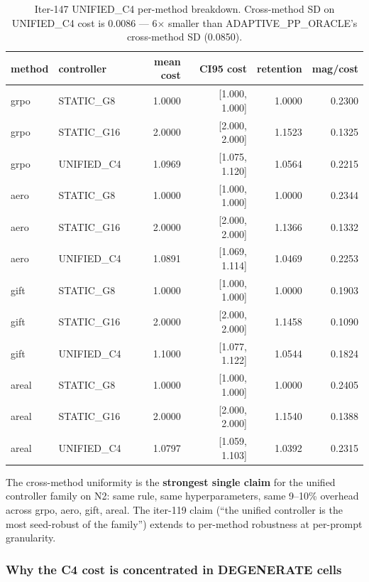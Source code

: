 \documentclass{article}
\begin{document}
\begin{table}[h]
\centering
\small
\caption{Iter-147 UNIFIED\_C4 per-method breakdown. Cross-method SD on
UNIFIED\_C4 cost is 0.0086 --- 6$\times$ smaller than ADAPTIVE\_PP\_ORACLE's
cross-method SD (0.0850).}
\label{tab:p7-iter147-per-method}
\begin{tabular}{llrrrr}
\toprule
method & controller & mean cost & CI95 cost & retention & mag/cost \\
\midrule
grpo  & STATIC\_G8         & 1.0000 & [1.000, 1.000] & 1.0000 & 0.2300 \\
grpo  & STATIC\_G16        & 2.0000 & [2.000, 2.000] & 1.1523 & 0.1325 \\
grpo  & UNIFIED\_C4        & 1.0969 & [1.075, 1.120] & 1.0564 & 0.2215 \\
aero  & STATIC\_G8         & 1.0000 & [1.000, 1.000] & 1.0000 & 0.2344 \\
aero  & STATIC\_G16        & 2.0000 & [2.000, 2.000] & 1.1366 & 0.1332 \\
aero  & UNIFIED\_C4        & 1.0891 & [1.069, 1.114] & 1.0469 & 0.2253 \\
gift  & STATIC\_G8         & 1.0000 & [1.000, 1.000] & 1.0000 & 0.1903 \\
gift  & STATIC\_G16        & 2.0000 & [2.000, 2.000] & 1.1458 & 0.1090 \\
gift  & UNIFIED\_C4        & 1.1000 & [1.077, 1.122] & 1.0544 & 0.1824 \\
areal & STATIC\_G8         & 1.0000 & [1.000, 1.000] & 1.0000 & 0.2405 \\
areal & STATIC\_G16        & 2.0000 & [2.000, 2.000] & 1.1540 & 0.1388 \\
areal & UNIFIED\_C4        & 1.0797 & [1.059, 1.103] & 1.0392 & 0.2315 \\
\bottomrule
\end{tabular}
\end{table}

The cross-method uniformity is the \textbf{strongest single claim} for the
unified controller family on N2: same rule, same hyperparameters, same
9--10\% overhead across grpo, aero, gift, areal. The iter-119 claim
(``the unified controller is the most seed-robust of the family'') extends
to per-method robustness at per-prompt granularity.

\subsubsection*{Why the C4 cost is concentrated in DEGENERATE cells}
\end{document}
